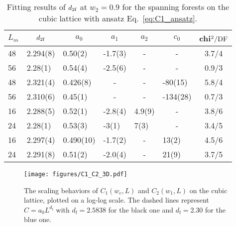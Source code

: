 \begin{table}[h]
\centering
\vspace{3ex}
\caption{Fitting results of ${d_{2\textrm{f}}}$ at $w_2 = 0.9$ for the spanning forests on the cubic lattice with ansatz Eq.~\eqref{eq:C1_ansatz}.}
\label{tab:C2_w1_3D} 
\begin{tabular}{|llllllc|}
\hline 
$L_{m}$   &\multicolumn{1}{c}{${d_{2\textrm{f}}}$}   &\multicolumn{1}{c}{$a_0$}    
&\multicolumn{1}{c}{$a_1$}  &\multicolumn{1}{c}{$a_2$} &\multicolumn{1}{c}{$c_0$}
& chi$^2/{\rm DF}$     \\
\hline 
48    &2.294(8)     &0.50(2)    &-1.7(3)    &\multicolumn{1}{c}{-} &\multicolumn{1}{c}{-} &3.7/4\\ 
56    &2.28(1)      &0.54(4)    &-2.5(6)    &\multicolumn{1}{c}{-} &\multicolumn{1}{c}{-} &0.9/3\\ 

48    &2.321(4)     &0.426(8)   &\multicolumn{1}{c}{-} &\multicolumn{1}{c}{-}      &-80(15)    &5.8/4\\ 
56    &2.310(6)     &0.45(1)    &\multicolumn{1}{c}{-} &\multicolumn{1}{c}{-}      &-134(28)   &0.7/3\\ 

16    &2.288(5)     &0.52(1)    &-2.8(4)    &4.9(9)     &\multicolumn{1}{c}{-}      &3.8/6\\ 
24    &2.28(1)      &0.53(3)    &-3(1)      &7(3)       &\multicolumn{1}{c}{-}      &3.4/5\\ 

16    &2.297(4)     &0.490(10)  &-1.7(2)    &\multicolumn{1}{c}{-}       &13(2)      &4.5/6\\ 
24    &2.291(8)     &0.51(2)    &-2.0(4)    &\multicolumn{1}{c}{-}       &21(9)      &3.7/5\\ 
\hline 
\end{tabular} 
\vspace{3ex}
\end{table} 

\begin{figure}[b]
	\vspace{3ex}
	\centering
	\texttt{[image: figures/C1\_C2\_3D.pdf]}
	\caption{The scaling behaviors of $C_1(w_c, L)$ and $C_2(w_1, L)$ on the cubic lattice, plotted on a log-log scale. The dashed lines
	represent $C = a_0 L^{d_{\text{f}}}$ with $d_\text{f} = 2.5838$ for the black one and $d_{\text{f}} =2.30$ for the blue one.}
	\label{fig:C1_C2_3D}
\end{figure}


